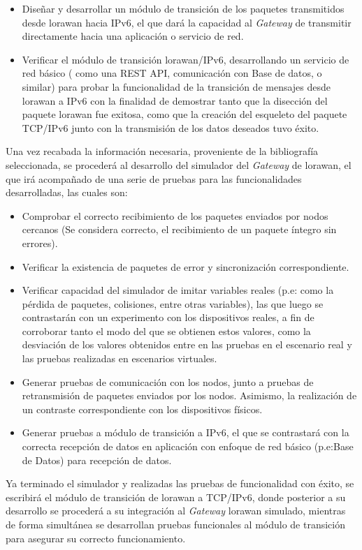 \begin{justify}
\begin{itemize}
\item Diseñar y desarrollar un módulo de transición de los paquetes transmitidos desde \gls{lorawan} hacia IPv6, el que dará la capacidad al \textit{Gateway} de transmitir directamente hacia una aplicación o servicio de red.
\item Verificar el módulo de transición \gls{lorawan}/IPv6, desarrollando un servicio de red básico ( como una REST API, comunicación con Base de datos, o similar) para probar la funcionalidad de la transición de mensajes desde \gls{lorawan} a IPv6 con la finalidad de demostrar tanto que la disección del paquete \gls{lorawan} fue exitosa, como que la creación del esqueleto del paquete TCP/IPv6 junto con la transmisión de los datos deseados tuvo éxito.
\end{itemize}

Una vez recabada la información necesaria, proveniente de la bibliografía seleccionada, se procederá al desarrollo del simulador del \textit{Gateway} de \gls{lorawan}, el que irá acompañado de una serie de pruebas para las funcionalidades desarrolladas, las cuales son:\\
\begin{itemize}
\item Comprobar el correcto recibimiento de los paquetes enviados por nodos cercanos (Se considera correcto, el recibimiento de un paquete íntegro sin errores).
\item Verificar la existencia de paquetes de error y sincronización correspondiente.
\item Verificar capacidad del simulador de imitar variables reales (p.e: como la pérdida de paquetes, colisiones, entre otras variables), las que luego se contrastarán con un experimento con los dispositivos reales, a fin de corroborar tanto el modo del que se obtienen estos valores, como la desviación de los valores obtenidos entre en las pruebas en el escenario real y las pruebas realizadas en escenarios virtuales.
\item Generar pruebas de comunicación con los nodos, junto a pruebas de retransmisión de paquetes enviados por los nodos. Asimismo, la realización de un contraste correspondiente con los dispositivos físicos.
\item Generar pruebas a módulo de transición a IPv6, el que se contrastará con la correcta recepción de datos en aplicación con enfoque de red básico (p.e:Base de Datos) para recepción de datos.
\end{itemize}
Ya terminado el simulador y realizadas las pruebas de funcionalidad con éxito, se escribirá el módulo de transición de \gls{lorawan} a TCP/IPv6, donde posterior a su desarrollo se procederá a su integración al \textit{Gateway} \gls{lorawan} simulado, mientras de forma simultánea se desarrollan pruebas funcionales al módulo de transición para asegurar su correcto funcionamiento.
\end{justify}